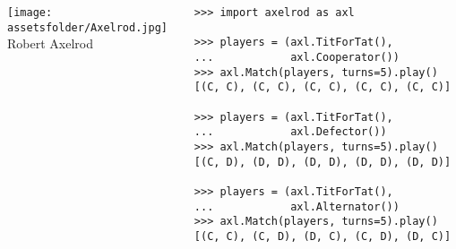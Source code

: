 \documentclass{beamer}
\newcommand{\assetsfolder}{./assets}
\newcommand{\researchfolder}{$HOME/rsc/axelrod-moran}
\newcommand{\mlresearchfolder}{$HOME/rsc/ml-paper}
\begin{document}
    \begin{frame}[fragile]{}
        \begin{columns}
            \begin{column}{.4\textwidth}
                \begin{center}
                    \texttt{[image: \\assetsfolder/Axelrod.jpg]}
                    \\
                    Robert Axelrod
                \end{center}
            \end{column}
            \pause
            \begin{column}{.6\textwidth}
                \begin{verbatim}
>>> import axelrod as axl

>>> players = (axl.TitForTat(),
...            axl.Cooperator())
>>> axl.Match(players, turns=5).play()
[(C, C), (C, C), (C, C), (C, C), (C, C)]

>>> players = (axl.TitForTat(),
...            axl.Defector())
>>> axl.Match(players, turns=5).play()
[(C, D), (D, D), (D, D), (D, D), (D, D)]

>>> players = (axl.TitForTat(),
...            axl.Alternator())
>>> axl.Match(players, turns=5).play()
[(C, C), (C, D), (D, C), (C, D), (D, C)]

                \end{verbatim}
            \end{column}
        \end{columns}
\end{frame}


\begin{frame}
    \scalebox{.7}{
        
    }
\end{frame}




\begin{frame}
    \begin{center}
        \scalebox{.7}{
            
        }
    \end{center}
\end{frame}
\end{document}
